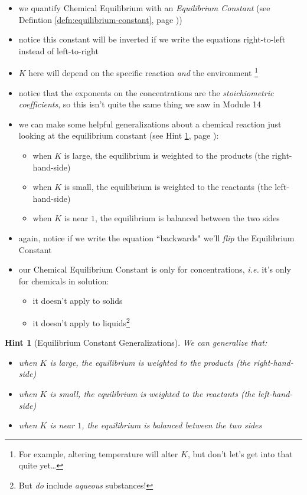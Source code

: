 \documentclass[11pt, oneside]{article}   	%
\newtheorem{hint}{Hint}
\begin{document}
\begin{itemize}
\item we quantify Chemical Equilibrium with an \emph{Equilibrium Constant} (see Defintion \ref{defn:equilibrium-constant}, page \pageref{defn:equilibrium-constant}))
\item notice this constant will be inverted if we write the equations right-to-left instead of left-to-right
\item $K$ here will depend on the specific reaction \emph{and} the environment
\footnote{For example, altering temperature will alter $K$, but don't let's get into that quite yet\ldots}
\item notice that the exponents on the concentrations are the \emph{stoichiometric coefficients}, so this isn't quite the same thing we saw in Module 14
\item we can make some helpful generalizations about a chemical reaction just looking at the equilibrium constant (see Hint \ref{hint:equilibrium-constant-generaiizations}, page \pageref{hint:equilibrium-constant-generaiizations}):
\begin{itemize}
\item when $K$ is large, the equilibrium is weighted to the products (the right-hand-side)
\item when $K$ is small, the equilibrium is weighted to the reactants (the left-hand-side)
\item when $K$ is near $1$, the equilibrium is balanced between the two sides
\end{itemize}
\item again, notice if we write the equation ``backwards" we'll \emph{flip} the Equilibrium Constant
\item our Chemical Equilibrium Constant is only for concentrations, \emph{i.e.} it's only for chemicals in solution:
\begin{itemize}
\item it doesn't apply to solids
\item it doesn't apply to liquids\footnote{But \emph{do} include \emph{aqueous} substances!}
\end{itemize}
\end{itemize}

\begin{hint}[Equilibrium Constant Generalizations]\label{hint:equilibrium-constant-generaiizations}
We can generalize that:\\
\begin{itemize}
\item when $K$ is large, the equilibrium is weighted to the products (the right-hand-side)
\item when $K$ is small, the equilibrium is weighted to the reactants (the left-hand-side)
\item when $K$ is near $1$, the equilibrium is balanced between the two sides
\end{itemize}
\end{hint}
\end{document}
